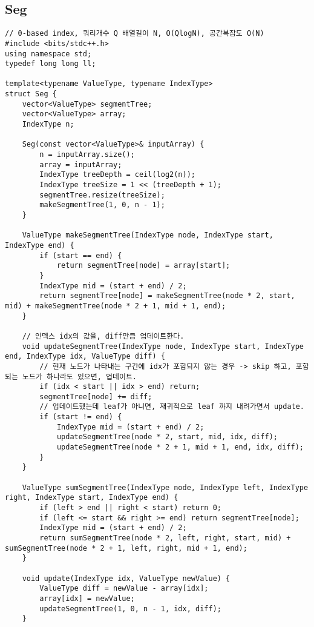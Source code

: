 \documentclass[landscape, 8pt, a4paper, oneside, twocolumn]{extarticle}
\begin{document}
    \subsection{Seg}
    \begin{verbatim}
// 0-based index, 쿼리개수 Q 배열길이 N, O(QlogN), 공간복잡도 O(N)
#include <bits/stdc++.h>
using namespace std;
typedef long long ll;

template<typename ValueType, typename IndexType>
struct Seg {
    vector<ValueType> segmentTree;
    vector<ValueType> array;
    IndexType n;

    Seg(const vector<ValueType>& inputArray) {
        n = inputArray.size();
        array = inputArray;
        IndexType treeDepth = ceil(log2(n));
        IndexType treeSize = 1 << (treeDepth + 1);
        segmentTree.resize(treeSize);
        makeSegmentTree(1, 0, n - 1);
    }

    ValueType makeSegmentTree(IndexType node, IndexType start, IndexType end) {
        if (start == end) {
            return segmentTree[node] = array[start];
        }
        IndexType mid = (start + end) / 2;
        return segmentTree[node] = makeSegmentTree(node * 2, start, mid) + makeSegmentTree(node * 2 + 1, mid + 1, end);
    }

    // 인덱스 idx의 값을, diff만큼 업데이트한다.
    void updateSegmentTree(IndexType node, IndexType start, IndexType end, IndexType idx, ValueType diff) {
        // 현재 노드가 나타내는 구간에 idx가 포함되지 않는 경우 -> skip 하고, 포함되는 노드가 하나라도 있으면, 업데이트.
        if (idx < start || idx > end) return;
        segmentTree[node] += diff;
        // 업데이트했는데 leaf가 아니면, 재귀적으로 leaf 까지 내려가면서 update.
        if (start != end) {
            IndexType mid = (start + end) / 2;
            updateSegmentTree(node * 2, start, mid, idx, diff);
            updateSegmentTree(node * 2 + 1, mid + 1, end, idx, diff);
        }
    }

    ValueType sumSegmentTree(IndexType node, IndexType left, IndexType right, IndexType start, IndexType end) {
        if (left > end || right < start) return 0;
        if (left <= start && right >= end) return segmentTree[node];
        IndexType mid = (start + end) / 2;
        return sumSegmentTree(node * 2, left, right, start, mid) + sumSegmentTree(node * 2 + 1, left, right, mid + 1, end);
    }

    void update(IndexType idx, ValueType newValue) {
        ValueType diff = newValue - array[idx];
        array[idx] = newValue;
        updateSegmentTree(1, 0, n - 1, idx, diff);
    }


\end{verbatim}
\end{document}
